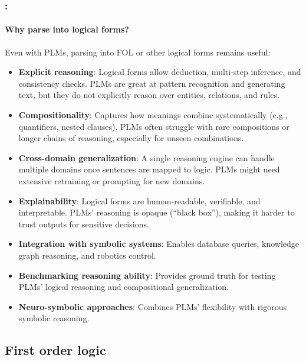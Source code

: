 \documentclass[xcolor=table]{beamer}
\begin{document}
\begin{frame}
	\frametitle{\insertshortsubtitle: \insertsection}
	\framesubtitle{Why parse into logical forms?}
	\scriptsize
	Even with PLMs, parsing into FOL or other logical forms remains useful:
	
	\begin{itemize}
		\item \textbf{Explicit reasoning}: Logical forms allow deduction, multi-step inference, and consistency checks.
		PLMs are great at pattern recognition and generating text, but they do not explicitly reason over entities, relations, and rules.
		
		\item \textbf{Compositionality}: Captures how meanings combine systematically (e.g., quantifiers, nested clauses).
		PLMs often struggle with rare compositions or longer chains of reasoning, especially for unseen combinations.
		
		\item \textbf{Cross-domain generalization}: A single reasoning engine can handle multiple domains once sentences are mapped to logic.
		PLMs might need extensive retraining or prompting for new domains.
		
		\item \textbf{Explainability}: Logical forms are human-readable, verifiable, and interpretable.
		PLMs' reasoning is opaque (``black box''), making it harder to trust outputs for sensitive decisions.
		
		\item \textbf{Integration with symbolic systems}: Enables database queries, knowledge graph reasoning, and robotics control.
		
		
		\item \textbf{Benchmarking reasoning ability}: Provides ground truth for testing PLMs' logical reasoning and compositional generalization.
		
		\item \textbf{Neuro-symbolic approaches}: Combines PLMs' flexibility with rigorous symbolic reasoning.
	\end{itemize}
	
\end{frame}


\subsection{First order logic}
\end{document}
